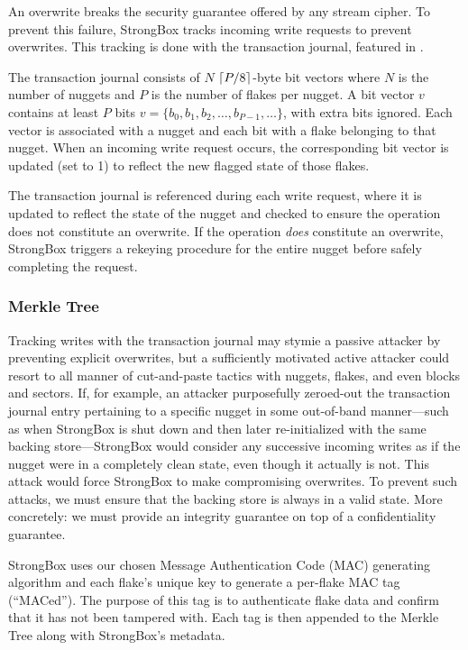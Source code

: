 An overwrite breaks the security guarantee offered by any stream
cipher. To prevent this failure, StrongBox tracks incoming write
requests to prevent overwrites. This tracking is done with the
transaction journal, featured in .

The transaction journal consists of $N$ $\lceil P / 8 \rceil$-byte bit
vectors where $N$ is the number of nuggets and $P$ is the number of
flakes per nugget. A bit vector $v$ contains at least $P$ bits $v = \{
b_0, b_1, b_2, \dots, b_{P-1}, \dots \}$, with extra bits ignored.
Each vector is associated with a nugget and each bit with a flake
belonging to that nugget. When an incoming write request occurs, the
corresponding bit vector is updated (set to 1) to reflect the new
flagged state of those flakes.

The transaction journal is referenced during each write request, where
it is updated to reflect the state of the nugget and checked to ensure
the operation does not constitute an overwrite. If the operation
\textit{does} constitute an overwrite, StrongBox triggers a rekeying
procedure for the entire nugget before safely completing the request.

\subsubsection{Merkle Tree} \label{sec:merkle}

Tracking writes with the transaction journal may stymie a passive
attacker by preventing explicit overwrites, but a sufficiently
motivated active attacker could resort to all manner of cut-and-paste
tactics with nuggets, flakes, and even blocks and sectors. If, for
example, an attacker purposefully zeroed-out the transaction journal
entry pertaining to a specific nugget in some out-of-band
manner---such as when StrongBox is shut down and then later
re-initialized with the same backing store---StrongBox would consider
any successive incoming writes as if the nugget were in a completely
clean state, even though it actually is not. This attack would force
StrongBox to make compromising overwrites. To prevent such attacks, we
must ensure that the backing store is always in a valid state. More
concretely: we must provide an integrity guarantee on top of a
confidentiality guarantee.

StrongBox uses our chosen Message Authentication Code (MAC) generating algorithm
and each flake's unique key to generate a per-flake MAC tag (``MACed''). The
purpose of this tag is to authenticate flake data and confirm that it has not
been tampered with. Each tag is then appended to the Merkle Tree along with
StrongBox's metadata.

